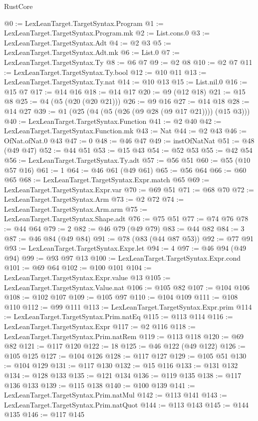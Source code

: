 \begin{lexlean}{RustCore}
\begin{coremodule}
@0 := LexLeanTarget.TargetSyntax.Program
@1 := LexLeanTarget.TargetSyntax.Program.mk
@2 := List.cons.{0}
@3 := LexLeanTarget.TargetSyntax.Adt
@4 := @2 @3
@5 := LexLeanTarget.TargetSyntax.Adt.mk
@6 := List.{0}
@7 := LexLeanTarget.TargetSyntax.Ty
@8 := @6 @7
@9 := @2 @8
@10 := @2 @7
@11 := LexLeanTarget.TargetSyntax.Ty.bool
@12 := @10 @11
@13 := LexLeanTarget.TargetSyntax.Ty.nat
@14 := @10 @13
@15 := List.nil.{0}
@16 := @15 @7
@17 := @14 @16
@18 := @14 @17
@20 := @9 (@12 @18)
@21 := @15 @8
@25 := @4 (@5 (@20 (@20 @21)))
@26 := @9 @16
@27 := @14 @18
@28 := @14 @27
@39 := @1 (@25 (@4 (@5 (@26 (@9 @28 (@9 @17 @21)))) (@15 @3)))
@40 := LexLeanTarget.TargetSyntax.Function
@41 := @2 @40
@42 := LexLeanTarget.TargetSyntax.Function.mk
@43 := Nat
@44 := @2 @43
@46 := OfNat.ofNat.{0} @43
@47 := 0
@48 := @46 @47
@49 := instOfNatNat
@51 := @48 (@49 @47)
@52 := @44 @51
@53 := @15 @43
@54 := @52 @53
@55 := @42 @54
@56 := LexLeanTarget.TargetSyntax.Ty.adt
@57 := @56 @51
@60 := @55 (@10 @57 @16)
@61 := 1
@64 := @46 @61 (@49 @61)
@65 := @56 @64
@66 := @60 @65
@68 := LexLeanTarget.TargetSyntax.Expr.match @65
@69 := LexLeanTarget.TargetSyntax.Expr.var
@70 := @69 @51
@71 := @68 @70
@72 := LexLeanTarget.TargetSyntax.Arm
@73 := @2 @72
@74 := LexLeanTarget.TargetSyntax.Arm.arm
@75 := LexLeanTarget.TargetSyntax.Shape.adt
@76 := @75 @51
@77 := @74 @76
@78 := @44 @64
@79 := 2
@82 := @46 @79 (@49 @79)
@83 := @44 @82
@84 := 3
@87 := @46 @84 (@49 @84)
@91 := @78 (@83 (@44 @87 @53))
@92 := @77 @91
@93 := LexLeanTarget.TargetSyntax.Expr.let
@94 := 4
@97 := @46 @94 (@49 @94)
@99 := @93 @97 @13
@100 := LexLeanTarget.TargetSyntax.Expr.cond
@101 := @69 @64
@102 := @100 @101
@104 := LexLeanTarget.TargetSyntax.Expr.value @13
@105 := LexLeanTarget.TargetSyntax.Value.nat
@106 := @105 @82
@107 := @104 @106
@108 := @102 @107
@109 := @105 @97
@110 := @104 @109
@111 := @108 @110
@112 := @99 @111
@113 := LexLeanTarget.TargetSyntax.Expr.prim
@114 := LexLeanTarget.TargetSyntax.Prim.natEq
@115 := @113 @114
@116 := LexLeanTarget.TargetSyntax.Expr
@117 := @2 @116
@118 := LexLeanTarget.TargetSyntax.Prim.natRem
@119 := @113 @118
@120 := @69 @82
@121 := @117 @120
@122 := 18
@125 := @46 @122 (@49 @122)
@126 := @105 @125
@127 := @104 @126
@128 := @117 @127
@129 := @105 @51
@130 := @104 @129
@131 := @117 @130
@132 := @15 @116
@133 := @131 @132
@134 := @128 @133
@135 := @121 @134
@136 := @119 @135
@138 := @117 @136 @133
@139 := @115 @138
@140 := @100 @139
@141 := LexLeanTarget.TargetSyntax.Prim.natMul
@142 := @113 @141
@143 := LexLeanTarget.TargetSyntax.Prim.natQuot
@144 := @113 @143
@145 := @144 @135
@146 := @117 @145

\end{coremodule}
\end{lexlean}
